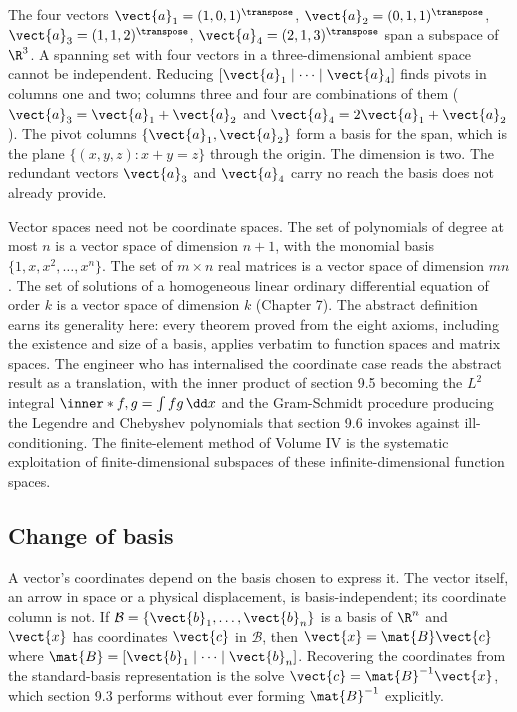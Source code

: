\begin{example}
The four vectors $\vect{a}_{1} = (1,0,1)^{\transpose}$, $\vect{a}_{2}
= (0,1,1)^{\transpose}$, $\vect{a}_{3} = (1,1,2)^{\transpose}$,
$\vect{a}_{4} = (2,1,3)^{\transpose}$ span a subspace of $\R^{3}$.
A spanning set with four vectors in a three-dimensional ambient
space cannot be independent. Reducing $[\vect{a}_{1} \mid \cdots
\mid \vect{a}_{4}]$ finds pivots in columns one and two; columns
three and four are combinations of them ($\vect{a}_{3} = \vect{a}_{1}
+ \vect{a}_{2}$ and $\vect{a}_{4} = 2\vect{a}_{1} + \vect{a}_{2}$).
The pivot
columns $\{\vect{a}_{1}, \vect{a}_{2}\}$ form a basis for the span,
which is the plane $\{(x, y, z) : x + y = z\}$ through the origin.
The dimension is two. The redundant vectors $\vect{a}_{3}$ and
$\vect{a}_{4}$ carry no reach the basis does not already provide.
\end{example}

\begin{mastery}
Vector spaces need not be coordinate spaces. The set of polynomials
of degree at most $n$ is a vector space of dimension $n + 1$, with
the monomial basis $\{1, x, x^{2}, \ldots, x^{n}\}$. The set of
$m \times n$ real matrices is a vector space of dimension $mn$. The
set of solutions of a homogeneous linear ordinary differential
equation of order $k$ is a vector space of dimension $k$ (Chapter 7).
The abstract definition earns its generality here: every theorem
proved from the eight axioms, including the existence and size of a
basis, applies verbatim to function spaces and matrix spaces. The
engineer who has internalised the coordinate case reads the abstract
result as a translation, with the inner product of section 9.5
becoming the $L^{2}$ integral $\inner*{f, g} = \int f g \,\dd x$ and
the Gram-Schmidt procedure producing the Legendre and Chebyshev
polynomials that section 9.6 invokes against ill-conditioning. The
finite-element method of Volume IV is the systematic exploitation of
finite-dimensional subspaces of these infinite-dimensional function
spaces.
\end{mastery}

\subsection{Change of basis}

A vector's coordinates depend on the basis chosen to express it.
The vector itself, an arrow in space or a physical displacement, is
basis-independent; its coordinate column is not. If
$\mathcal{B} = \{\vect{b}_{1}, \ldots, \vect{b}_{n}\}$ is a basis of
$\R^{n}$ and $\vect{x}$ has coordinates $\vect{c}$ in $\mathcal{B}$,
then $\vect{x} = \mat{B}\vect{c}$ where $\mat{B} = [\vect{b}_{1}
\mid \cdots \mid \vect{b}_{n}]$. Recovering the coordinates from the
standard-basis representation is the solve $\vect{c} =
\mat{B}^{-1}\vect{x}$, which section 9.3 performs without ever
forming $\mat{B}^{-1}$ explicitly.

